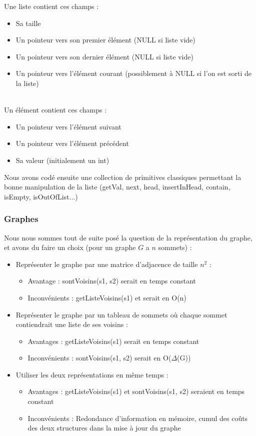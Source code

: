 \documentclass[a4paper,10pt]{article}
\newcommand*{\itemb}{\item[$\bullet$]}
\begin{document}
Une liste contient ces champs :
\begin{itemize}
	\itemb Sa taille
	\itemb Un pointeur vers son premier élément (NULL si liste vide)
	\itemb Un pointeur vers son dernier élément (NULL si liste vide)
	\itemb Un pointeur vers l'élément courant (possiblement à NULL si l'on est sorti de la liste)
\end{itemize}
~~\\
Un élément contient ces champs :
\begin{itemize}
	\itemb Un pointeur vers l'élément suivant
	\itemb Un pointeur vers l'élément précédent
	\itemb Sa valeur (initialement un int)
\end{itemize}

Nous avons codé ensuite une collection de primitives classiques permettant la bonne manipulation de la liste (getVal, next, head, insertInHead, contain, isEmpty, isOutOfList...)

\subsubsection{Graphes}

Nous nous sommes tout de suite posé la question de la représentation du graphe, et avons du faire un choix (pour un graphe $G$ a $n$ sommets) :
\begin{itemize}
	\itemb Représenter le graphe par une matrice d'adjacence de taille $n^2$ :
	\begin{itemize}
		\item Avantage : sontVoisins(s1, s2) serait en temps constant
		\item Inconvénients : getListeVoisins(s1) et serait en O(n)
	\end{itemize}
\itemb Représenter le graphe par un tableau de sommets où chaque sommet contiendrait une liste de ses voisins :
	\begin{itemize}
		\item Avantages : getListeVoisins(s1) serait en temps constant
	\item Inconvénients : sontVoisins(s1, s2) serait en O($\Delta$(G))
	\end{itemize}
\itemb Utiliser les deux représentations en même temps :
	\begin{itemize}
		\item Avantages : getListeVoisins(s1) et sontVoisins(s1, s2) seraient en temps constant
		\item Inconvénients : Redondance d'information en mémoire, cumul des coûts des deux structures dans la mise à jour du graphe
	\end{itemize}
\end{itemize}
\end{document}
